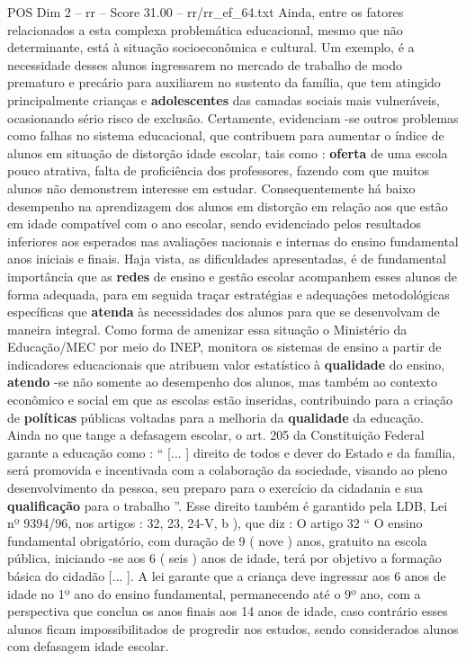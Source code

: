 \begin{textsample}{POS Dim 2 – rr – Score 31.00 – rr/rr\_ef\_64.txt}
Ainda, entre os fatores relacionados a esta complexa problemática educacional, mesmo que não determinante, está à situação socioeconômica e cultural.
Um exemplo, é a necessidade desses alunos ingressarem no mercado de trabalho de modo prematuro e precário para auxiliarem no sustento da família, que tem atingido principalmente crianças e \textbf{adolescentes} das camadas sociais mais vulneráveis, ocasionando sério risco de exclusão.
Certamente, evidenciam -se outros problemas como falhas no sistema educacional, que contribuem para aumentar o índice de alunos em situação de distorção idade escolar, tais como : \textbf{oferta} de uma escola pouco atrativa, falta de proficiência dos professores, fazendo com que muitos alunos não demonstrem interesse em estudar.
Consequentemente há baixo desempenho na aprendizagem dos alunos em distorção em relação aos que estão em idade compatível com o ano escolar, sendo evidenciado pelos resultados inferiores aos esperados nas avaliações nacionais e internas do ensino fundamental anos iniciais e finais.
Haja vista, as dificuldades apresentadas, é de fundamental importância que as \textbf{redes} de ensino e gestão escolar acompanhem esses alunos de forma adequada, para em seguida traçar estratégias e adequações metodológicas específicas que \textbf{atenda} às necessidades dos alunos para que se desenvolvam de maneira integral.
Como forma de amenizar essa situação o Ministério da Educação/MEC por meio do INEP, monitora os sistemas de ensino a partir de indicadores educacionais que atribuem valor estatístico à \textbf{qualidade} do ensino, \textbf{atendo} -se não somente ao desempenho dos alunos, mas também ao contexto econômico e social em que as escolas estão inseridas, contribuindo para a criação de \textbf{políticas} públicas voltadas para a melhoria da \textbf{qualidade} da educação.
Ainda no que tange a defasagem escolar, o art. 205 da Constituição Federal garante a educação como : “ [... ] direito de todos e dever do Estado e da família, será promovida e incentivada com a colaboração da sociedade, visando ao pleno desenvolvimento da pessoa, seu preparo para o exercício da cidadania e sua \textbf{qualificação} para o trabalho ”.
Esse direito também é garantido pela LDB, Lei nº 9394/96, nos artigos : 32, 23, 24-V, b ), que diz : O artigo 32 “ O ensino fundamental obrigatório, com duração de 9 ( nove ) anos, gratuito na escola pública, iniciando -se aos 6 ( seis ) anos de idade, terá por objetivo a formação básica do cidadão [... ].
A lei garante que a criança deve ingressar aos 6 anos de idade no 1º ano do ensino fundamental, permanecendo até o 9º ano, com a perspectiva que conclua os anos finais aos 14 anos de idade, caso contrário esses alunos ficam impossibilitados de progredir nos estudos, sendo considerados alunos com defasagem idade escolar.

\end{textsample}
